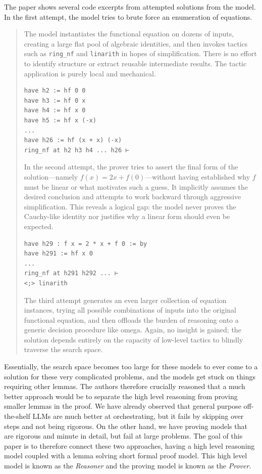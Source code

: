 \documentclass[12pt, letterpaper]{article}
\begin{document}
The paper shows several code excerpts from attempted solutions from the model. In the first attempt, the model tries to brute force an enumeration of equations. \begin{quote}{ The model instantiates the
functional equation on dozens of inputs, creating a large flat pool of algebraic identities, and then
invokes tactics such as \texttt{ring\_nf} and \texttt{linarith} in hopes of simplification. There is no effort to
identify structure or extract reusable intermediate results. The tactic application is purely local and
mechanical}. 

\begin{lstlisting}[style=leanstyle]
have h2 := hf 0 0
have h3 := hf 0 x
have h4 := hf x 0
have h5 := hf x (-x)
...
have h26 := hf (x + x) (-x)
ring_nf at h2 h3 h4 ... h26 ⊢
\end{lstlisting}

In the second attempt, the prover tries to assert the final form of the solution—namely $f (x) =
2x + f (0)$—without having established why $f$ must be linear or what motivates such a guess. It
implicitly assumes the desired conclusion and attempts to work backward through aggressive
simplification. This reveals a logical gap: the model never proves the Cauchy-like identity nor
justifies why a linear form should even be expected.

\begin{lstlisting}[style=leanstyle]
have h29 : f x = 2 * x + f 0 := by
have h291 := hf x 0
...
ring_nf at h291 h292 ... ⊢
<;> linarith
\end{lstlisting}
The third attempt generates an even larger collection of equation instances, trying all possible
combinations of inputs into the original functional equation, and then offloads the burden of
reasoning onto a generic decision procedure like omega. Again, no insight is gained; the solution
depends entirely on the capacity of low-level tactics to blindly traverse the search space. \citep{zhou2025solvingformalmathproblems}
\end{quote}

Essentially, the search space becomes too large for these models to ever come to a solution for these very complicated problems, and the models get stuck on things requiring other lemmas. The authors therefore crucially reasoned that a much better approach would be to separate the high level reasoning from proving smaller lemmas in the proof. We have already observed that general purpose off-the-shelf LLMs are much better at orchestrating, but it fails by skipping over steps and not being rigorous. On the other hand, we have proving models that are rigorous and minute in detail, but fail at large problems. The goal of this paper is to therefore connect these two approaches, having a high level reasoning model coupled with a lemma solving short formal proof model. This high level model is known as the \textit{Reasoner} and the proving model is known as the \textit{Prover.}
\end{document}
